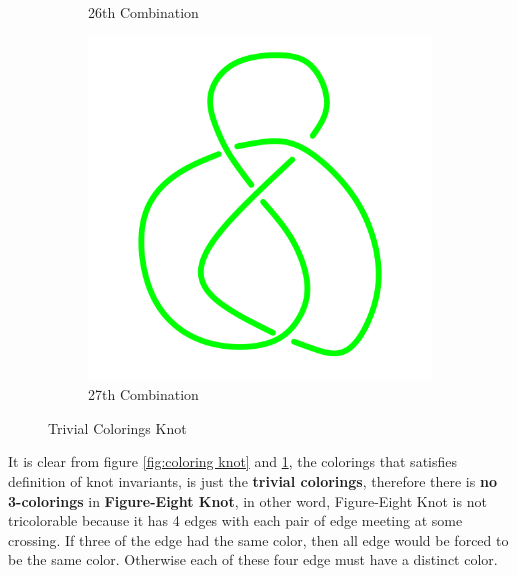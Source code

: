 \documentclass[a4paper,9pt]{article}
\begin{document}
\begin{enumerate}
\begin{figure}[h!]
\begin{subfigure}[b]{0.3\linewidth}
		\caption{26th Combination}
	\end{subfigure}
	\qquad
	\begin{subfigure}[b]{0.3\linewidth}
		\centering
		\includegraphics[width=\linewidth]{picture/knotpict/knot-27}
		\caption{27th Combination}
	\end{subfigure}
	\qquad
	\caption{Trivial Colorings Knot}
	\label{fig:trivialcolor}
\end{figure}
\newline
It is clear from figure \ref{fig:coloring knot} and \ref{fig:trivialcolor}, the colorings that satisfies definition of knot invariants, is just the \textbf{trivial colorings}, therefore there is \textbf{no 3-colorings} in \textbf{Figure-Eight Knot}, in other word, Figure-Eight Knot is not tricolorable because it has 4 edges with each pair of edge meeting at some crossing. If three of the edge had the same color, then all edge would be forced to be the same color. Otherwise each of these four edge must have a distinct color.
\end{enumerate}
\end{document}
